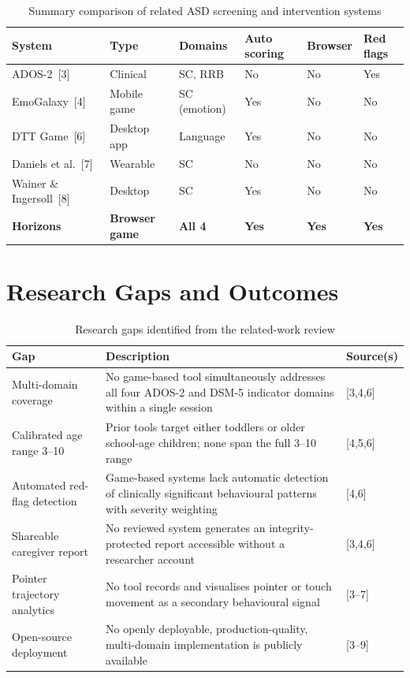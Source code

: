 \documentclass[12pt,a4paper,oneside]{report}
\begin{document}
	\begin{table}[t]
		\caption{Summary comparison of related ASD screening and intervention systems}
		\label{tab:related}
		\begin{tabularx}{\linewidth}{lXXXXX}
			\toprule
			\textbf{System} & \textbf{Type} & \textbf{Domains} & \textbf{Auto scoring} & \textbf{Browser} & \textbf{Red flags} \\
			\midrule
			ADOS-2~[3]              & Clinical    & SC, RRB      & No  & No  & Yes \\
			EmoGalaxy~[4]           & Mobile game & SC (emotion) & Yes & No  & No  \\
			DTT Game~[6]            & Desktop app & Language     & Yes & No  & No  \\
			Daniels et al.~[7]      & Wearable    & SC           & No  & No  & No  \\
			Wainer \& Ingersoll~[8] & Desktop     & SC           & Yes & No  & No  \\
			\textbf{Horizons}       & \textbf{Browser game} & \textbf{All 4} & \textbf{Yes} & \textbf{Yes} & \textbf{Yes} \\
			\bottomrule
		\end{tabularx}
	\end{table}
	
	
	\section{Research Gaps and Outcomes}
	
	\begin{table}[t]
		\caption{Research gaps identified from the related-work review}
		\label{tab:gaps}
		\begin{tabularx}{\linewidth}{p{4.0cm}Xp{2.0cm}}
			\toprule
			\textbf{Gap} & \textbf{Description} & \textbf{Source(s)} \\
			\midrule
			Multi-domain coverage
			& No game-based tool simultaneously addresses all four ADOS-2 and DSM-5 indicator domains within a single session
			& [3,4,6] \\
			Calibrated age range 3--10
			& Prior tools target either toddlers or older school-age children; none span the full 3--10 range
			& [4,5,6] \\
			Automated red-flag detection
			& Game-based systems lack automatic detection of clinically significant behavioural patterns with severity weighting
			& [4,6] \\
			Shareable caregiver report
			& No reviewed system generates an integrity-protected report accessible without a researcher account
			& [3,4,6] \\
			Pointer trajectory analytics
			& No tool records and visualises pointer or touch movement as a secondary behavioural signal
			& [3--7] \\
			Open-source deployment
			& No openly deployable, production-quality, multi-domain implementation is publicly available
			& [3--9] \\
			\bottomrule
		\end{tabularx}
	\end{table}
	
\end{document}
